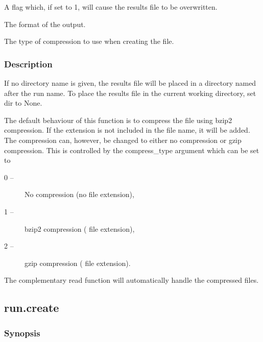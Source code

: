   A flag which, if set to 1, will cause the results file to be overwritten. 

  The format of the output. 

  The type of compression to use when creating the file. 




\subsubsection{Description}

If no directory name is given, the results file will be placed in a directory named after the run name.  To place the results file in the current working directory, set dir to None.


The default behaviour of this function is to compress the file using bzip2 compression.  If the extension  is not included in the file name, it will be added.  The compression can, however, be changed to either no compression or gzip compression.  This is controlled by the compress\_type argument which can be set to


\begin{description}
\item[0 --]  No compression (no file extension), 
\item[1 --]  bzip2 compression ( file extension), 
\item[2 --]  gzip compression ( file extension). 
\end{description}


The complementary read function will automatically handle the compressed files.




\newpage

\subsection{run.create}


\subsubsection{Synopsis}


